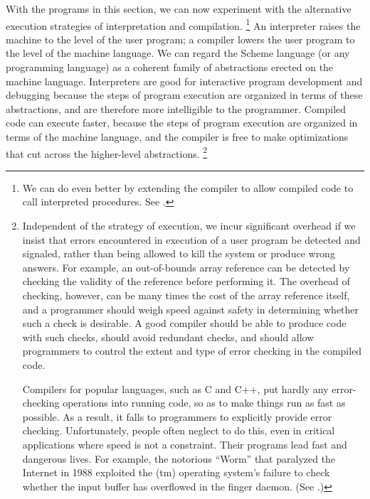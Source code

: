 With the programs in this section, we can now experiment with the alternative execution strategies of interpretation and compilation.%
\footnote{
	We can do even better by extending the compiler to allow compiled code to call interpreted procedures.
	See .
}
An interpreter raises the machine to the level of the user program;
a compiler lowers the user program to the level of the machine language.
We can regard the Scheme language (or any programming language) as a coherent family of abstractions erected on the machine language.
Interpreters are good for interactive program development and debugging because the steps of program execution are organized in terms of these abstractions, and are therefore more intelligible to the programmer.
Compiled code can execute faster, because the steps of program execution are organized in terms of the machine language, and the compiler is free to make optimizations that cut across the higher-level abstractions.%
\footnote{
	Independent of the strategy of execution, we incur significant overhead if we insist that errors encountered in execution of a user program be detected and signaled, rather than being allowed to kill the system or produce wrong answers.
	For example, an out-of-bounds array reference can be detected by checking the validity of the reference before performing it.
	The overhead of checking, however, can be many times the cost of the array reference itself, and a programmer should weigh speed against safety in determining whether such a check is desirable.
	A good compiler should be able to produce code with such checks, should avoid redundant checks, and should allow programmers to control the extent and type of error checking in the compiled code.

	Compilers for popular languages, such as C and C++, put hardly any error-checking operations into running code, so as to make things run as fast as possible.
	As a result, it falls to programmers to explicitly provide error checking.
	Unfortunately, people often neglect to do this, even in critical applications where speed is not a constraint.
	Their programs lead fast and dangerous lives.
	For example, the notorious “Worm” that paralyzed the Internet in 1988 exploited the (tm) operating system’s failure to check whether the input buffer has overflowed in the finger daemon.
	(See .)
}

